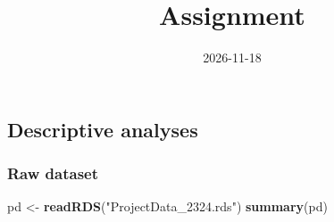 \documentclass[
]{article}
\title{Assignment}
\author{}
\date{\vspace{-2.5em}2026-11-18}
\newenvironment{Shaded}{\begin{snugshade}}{\end{snugshade}}
\newcommand{\FunctionTok}[1]{\textcolor[rgb]{0.13,0.29,0.53}{\textbf{#1}}}
\newcommand{\NormalTok}[1]{#1}
\newcommand{\OtherTok}[1]{\textcolor[rgb]{0.56,0.35,0.01}{#1}}
\newcommand{\StringTok}[1]{\textcolor[rgb]{0.31,0.60,0.02}{#1}}
\begin{document}
\maketitle

\subsection{Descriptive analyses}\label{descriptive-analyses}

\subsubsection{Raw dataset}\label{raw-dataset}

\begin{Shaded}
\begin{Highlighting}[]
\NormalTok{pd }\OtherTok{\textless{}{-}} \FunctionTok{readRDS}\NormalTok{(}\StringTok{"ProjectData\_2324.rds"}\NormalTok{)}
\FunctionTok{summary}\NormalTok{(pd)}
\end{Highlighting}
\end{Shaded}
\end{document}
